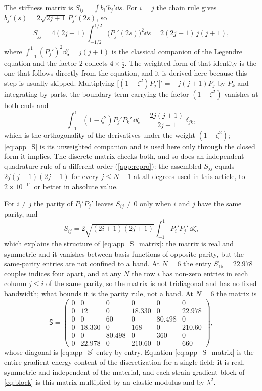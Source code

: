The stiffness matrix is $S_{ij}=\int b_i'b_j'\dd s$.  For $i=j$ the chain rule
gives $b_j'(s)=2\sqrt{2j+1}\,P_j'(2s)$, so
\begin{equation}
\label{eq:app_S}
S_{jj}=4(2j+1)\int_{-1/2}^{1/2}\bigl(P_j'(2s)\bigr)^{2}\dd s
=2(2j+1)\,j(j+1),
\end{equation}
where $\int_{-1}^{1}(P_j')^{2}\dd\zeta=j(j+1)$ is the classical companion of the
Legendre equation and the factor $2$ collects $4\times\tfrac12$.  The weighted
form of that identity is the one that follows directly from the equation, and it is derived here because this step is usually skipped.  Multiplying
$\bigl[(1-\zeta^{2})P_j'\bigr]'=-j(j+1)P_j$ by $P_k$ and integrating by parts, the
boundary term carrying the factor $(1-\zeta^{2})$ vanishes at both ends and
\begin{equation}
\label{eq:app_S_weighted}
\int_{-1}^{1}(1-\zeta^{2})P_j'P_k'\,\dd\zeta
=\frac{2j(j+1)}{2j+1}\,\delta_{jk},
\end{equation}
which is the orthogonality of the derivatives under the weight
$(1-\zeta^{2})$; \eqref{eq:app_S} is its unweighted companion and is used here
only through the closed form it implies.  The discrete matrix checks both, and so
does an independent quadrature rule of a different order
(\cref{app:repro}): the assembled $S_{jj}$ equals $2j(j+1)(2j+1)$ for every
$j\le N-1$ at all degrees used in this article, to $2\times10^{-11}$ or better
in absolute value.

For $i\neq j$ the parity of $P_i'P_j'$ leaves $S_{ij}\neq0$ only when $i$ and $j$
have the same parity, and
\begin{equation}
\label{eq:app_S_off}
S_{ij}=2\sqrt{(2i+1)(2j+1)}\int_{-1}^{1}P_i'P_j'\,\dd\zeta ,
\end{equation}
which explains the structure of \eqref{eq:app_S_matrix}: the matrix is
real and symmetric and it vanishes between basis functions of opposite parity,
but the same-parity entries are not confined to a band.  At $N=6$ the entry
$S_{15}=22.978$ couples indices four apart, and at any $N$ the row $i$ has
non-zero entries in each column $j\le i$ of the same parity, so the matrix is
not tridiagonal and has no fixed bandwidth; what bounds it is the parity rule,
not a band.  At $N=6$ the matrix is
\begin{equation}
\label{eq:app_S_matrix}
\mathsf S=
\begin{pmatrix}
0&0&0&0&0&0\\
0&12&0&18.330&0&22.978\\
0&0&60&0&80.498&0\\
0&18.330&0&168&0&210.60\\
0&0&80.498&0&360&0\\
0&22.978&0&210.60&0&660
\end{pmatrix},
\end{equation}
whose diagonal is \eqref{eq:app_S} entry by entry.  Equation
\eqref{eq:app_S_matrix} is the entire gradient-energy content of the
discretization for a single field: it is real, symmetric and independent of the
material, and each strain-gradient block of \eqref{eq:block} is this matrix
multiplied by an elastic modulus and by $\lambda^{2}$.

